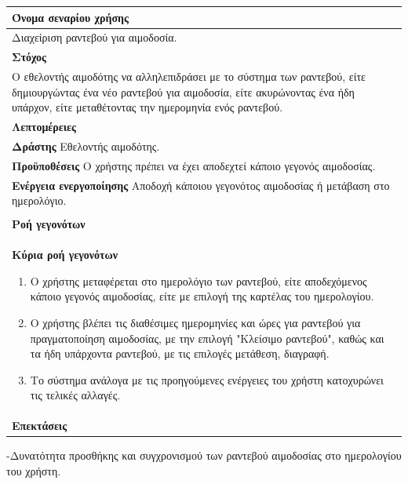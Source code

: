\begin{center}
    \begin{tabular}{|p{\dimexpr \linewidth-2\tabcolsep}|}
    \hline
    \rowcolor{grayy}
    \textbf{Όνομα σεναρίου χρήσης}
    \\ \hline    
     Διαχείριση ραντεβού για αιμοδοσία.
     \\ \hline
    \rowcolor{grayy}
    \textbf{\textbf{Στόχος}}
    \\ \hline
 	 Ο εθελοντής αιμοδότης να αλληλεπιδράσει με το σύστημα των ραντεβού, είτε δημιουργώντας ένα νέο ραντεβού για αιμοδοσία, είτε ακυρώνοντας ένα ήδη υπάρχον, είτε μεταθέτοντας την ημερομηνία ενός ραντεβού.
    \\ \hline
    \rowcolor{grayy}
    \textbf{Λεπτομέρειες}
    \\ \hline
	\textbf{Δράστης} Εθελοντής αιμοδότης.
	\\*
	\textbf{Προϋποθέσεις} Ο χρήστης πρέπει να έχει αποδεχτεί κάποιο γεγονός αιμοδοσίας.
	\\*
	\textbf{Ενέργεια ενεργοποίησης} Αποδοχή κάποιου γεγονότος αιμοδοσίας ή μετάβαση στο ημερολόγιο.
	\\ \hline
    \\ \hline
	\rowcolor{grayy}    
    \textbf{Ροή γεγονότων}
    \\* 
	\textbf{Κύρια ροή γεγονότων}
	\begin{enumerate}
	\item	 Ο χρήστης μεταφέρεται στο ημερολόγιο των ραντεβού, είτε αποδεχόμενος κάποιο γεγονός αιμοδοσίας, είτε με επιλογή της καρτέλας του ημερολογίου.
	\item  Ο χρήστης βλέπει τις διαθέσιμες ημερομηνίες και ώρες για ραντεβού για πραγματοποίηση αιμοδοσίας, με την επιλογή "Κλείσιμο ραντεβού", καθώς και τα ήδη υπάρχοντα ραντεβού, με τις επιλογές μετάθεση, διαγραφή.
	\item Το σύστημα ανάλογα με τις προηγούμενες ενέργειες του χρήστη κατοχυρώνει τις τελικές αλλαγές.
	\end{enumerate}
	\\*
	\textbf{Επεκτάσεις}
	   \\ \hline
    \end{tabular}
\end{center}	
			
-Δυνατότητα προσθήκης και συγχρονισμού των ραντεβού αιμοδοσίας στο ημερολογίου του χρήστη.

